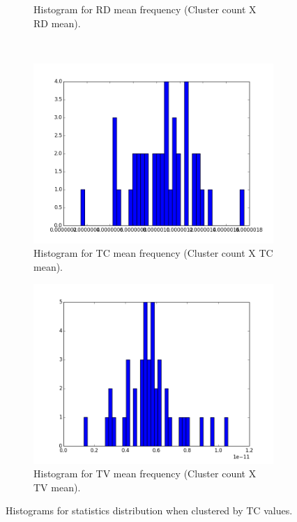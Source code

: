 \documentclass[a4paper,11pt]{report}
\begin{document}
\begin{figure}[!ht]
\begin{subfigure}[t]{.49\textwidth}
        \caption{Histogram for RD mean frequency (Cluster count X RD mean).}
        \label{subfig:fa_hist_rd}
      \end{subfigure}\hfill\\
      \begin{subfigure}[t]{.49\textwidth}
        \includegraphics[width=1\linewidth]{img/histograms/tc_clustered_fa_mask_tc_means_hist.png}
        \caption{Histogram for TC mean frequency (Cluster count X TC mean).}
        \label{subfig:fa_hist_tc}
      \end{subfigure}\hfill%
      \begin{subfigure}[t]{.49\textwidth}
        \includegraphics[width=1\linewidth]{img/histograms/tc_clustered_fa_mask_tv_means_hist.png}
        \caption{Histogram for TV mean frequency (Cluster count X TV mean).}
        \label{subfig:fa_hist_tv}
      \end{subfigure}\hfill

      \caption{Histograms for statistics distribution when clustered by TC values.}
      \label{fig:fa-histograms}
    \end{figure}
\end{document}
